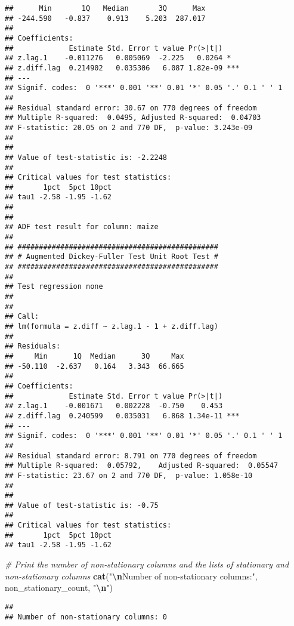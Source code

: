 \documentclass[
]{article}
\newenvironment{Shaded}{\begin{snugshade}}{\end{snugshade}}
\newcommand{\CommentTok}[1]{\textcolor[rgb]{0.56,0.35,0.01}{\textit{#1}}}
\newcommand{\FunctionTok}[1]{\textcolor[rgb]{0.13,0.29,0.53}{\textbf{#1}}}
\newcommand{\NormalTok}[1]{#1}
\newcommand{\SpecialCharTok}[1]{\textcolor[rgb]{0.81,0.36,0.00}{\textbf{#1}}}
\newcommand{\StringTok}[1]{\textcolor[rgb]{0.31,0.60,0.02}{#1}}
\begin{document}
\begin{verbatim}
##      Min       1Q   Median       3Q      Max 
## -244.590   -0.837    0.913    5.203  287.017 
## 
## Coefficients:
##             Estimate Std. Error t value Pr(>|t|)    
## z.lag.1    -0.011276   0.005069  -2.225   0.0264 *  
## z.diff.lag  0.214902   0.035306   6.087 1.82e-09 ***
## ---
## Signif. codes:  0 '***' 0.001 '**' 0.01 '*' 0.05 '.' 0.1 ' ' 1
## 
## Residual standard error: 30.67 on 770 degrees of freedom
## Multiple R-squared:  0.0495, Adjusted R-squared:  0.04703 
## F-statistic: 20.05 on 2 and 770 DF,  p-value: 3.243e-09
## 
## 
## Value of test-statistic is: -2.2248 
## 
## Critical values for test statistics: 
##       1pct  5pct 10pct
## tau1 -2.58 -1.95 -1.62
## 
## 
## ADF test result for column: maize 
## 
## ############################################### 
## # Augmented Dickey-Fuller Test Unit Root Test # 
## ############################################### 
## 
## Test regression none 
## 
## 
## Call:
## lm(formula = z.diff ~ z.lag.1 - 1 + z.diff.lag)
## 
## Residuals:
##     Min      1Q  Median      3Q     Max 
## -50.110  -2.637   0.164   3.343  66.665 
## 
## Coefficients:
##             Estimate Std. Error t value Pr(>|t|)    
## z.lag.1    -0.001671   0.002228  -0.750    0.453    
## z.diff.lag  0.240599   0.035031   6.868 1.34e-11 ***
## ---
## Signif. codes:  0 '***' 0.001 '**' 0.01 '*' 0.05 '.' 0.1 ' ' 1
## 
## Residual standard error: 8.791 on 770 degrees of freedom
## Multiple R-squared:  0.05792,    Adjusted R-squared:  0.05547 
## F-statistic: 23.67 on 2 and 770 DF,  p-value: 1.058e-10
## 
## 
## Value of test-statistic is: -0.75 
## 
## Critical values for test statistics: 
##       1pct  5pct 10pct
## tau1 -2.58 -1.95 -1.62
\end{verbatim}

\begin{Shaded}
\begin{Highlighting}[]
\CommentTok{\# Print the number of non{-}stationary columns and the lists of stationary and non{-}stationary columns}
\FunctionTok{cat}\NormalTok{(}\StringTok{"}\SpecialCharTok{\textbackslash{}n}\StringTok{Number of non{-}stationary columns:"}\NormalTok{, non\_stationary\_count, }\StringTok{"}\SpecialCharTok{\textbackslash{}n}\StringTok{"}\NormalTok{)}
\end{Highlighting}
\end{Shaded}

\begin{verbatim}
## 
## Number of non-stationary columns: 0
\end{verbatim}
\end{document}
